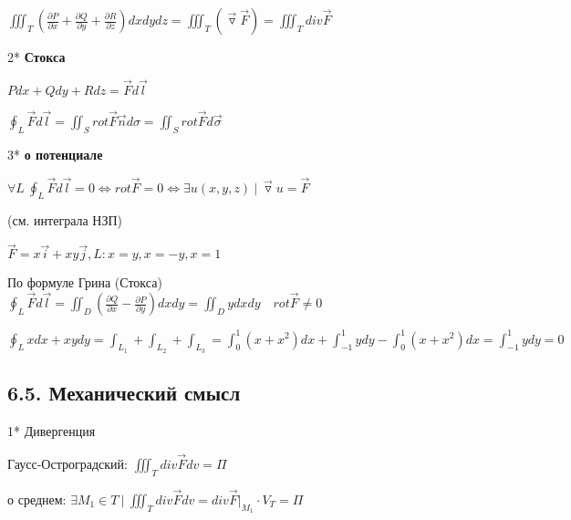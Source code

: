 \documentclass[12pt]{article}
\begin{document}
    $\iiint_T \left(\frac{\partial P}{\partial x} + \frac{\partial Q}{\partial y} + \frac{\partial R}{\partial z}\right) dxdydz = \iiint_T (\overrightarrow{\triangledown} \overrightarrow{F}) = \iiint_T div \overrightarrow{F}$


    \mediumvspace

    \hypertarget{theoremStokesinvectorform}{}

    2* \textbf{Стокса}

    $Pdx + Qdy + Rdz = \overrightarrow{F}d\overrightarrow{l}$

    $\oint_L \overrightarrow{F}d\overrightarrow{l} = \iint_S rot \overrightarrow{F} \overrightarrow{n} d\sigma = \iint_S rot \overrightarrow{F} d\overrightarrow{\sigma}$

    \mediumvspace

    \hypertarget{theoremaboutpotentialinvectorform}{}

    3* \textbf{\Ths о потенциале}

    $\forall L \ \oint_L \overrightarrow{F}d\overrightarrow{l} = 0 \Longleftrightarrow rot \overrightarrow{F} = 0 \Longleftrightarrow \exists u(x, y, z) \ | \ \overrightarrow{\triangledown} u = \overrightarrow{F}$

    (см. \Ths интеграла НЗП)

    \Ex $\overrightarrow{F} = x\overrightarrow{i} + xy \overrightarrow{j}, L: x = y, x = -y, x = 1$

    По формуле Грина (Стокса) $\oint_L \overrightarrow{F} d\overrightarrow{l} = \iint_{D} \left(\frac{\partial Q}{\partial x} - \frac{\partial P}{\partial y}\right) dxdy =
    \iint_D y dxdy \quad rot \overrightarrow{F} \neq 0$

    $\oint_L xdx + xydy = \int_{L_1} + \int_{L_2} + \int_{L_3} = \int_0^1 (x + x^2) dx + \int_{-1}^1 y dy - \int_0^1 (x + x^2) dx = \int_{-1}^1 y dy = 0$

    \subsection{6.5. Механический смысл}

    \hypertarget{divergencemechanicalmeaning}{}

    1* Дивергенция

    Гаусс-Остроградский: $\iiint_T div \overrightarrow{F} dv = \Pi$

    \Ths о среднем: $\exists M_1 \in T \ | \ \iiint_T div \overrightarrow{F} dv = div \overrightarrow{F} \Big|_{M_1} \cdot V_T = \Pi$
\end{document}
